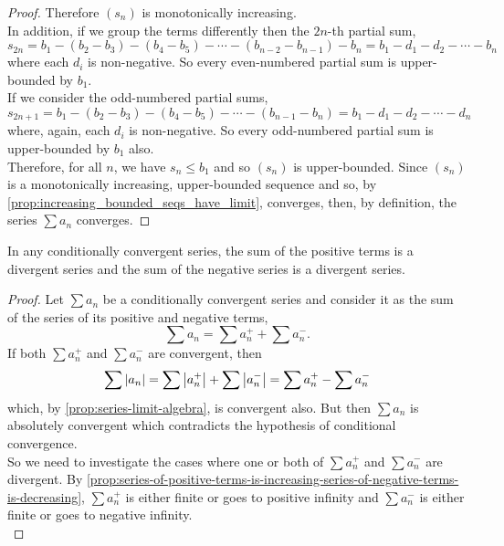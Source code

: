 \documentclass[../MathsNotesBase.tex]{subfiles}
\begin{document}
{\begin{proof}
			Therefore $(s_n)$ is monotonically increasing.\\
			
			In addition, if we group the terms differently then the $2n$-th partial sum,
			\[ s_{2n} = b_1 - (b_2 - b_3) - (b_4 - b_5) - \cdots - (b_{n-2} - b_{n-1}) - b_n = b_1 - d_1 - d_2 - \cdots - b_n \]
			where each $d_i$ is non-negative. So every even-numbered partial sum is upper-bounded by $b_1$.\\
			
			If we consider the odd-numbered partial sums,
			\[ s_{2n+1} = b_1 - (b_2 - b_3) - (b_4 - b_5) - \cdots - (b_{n-1} - b_n) = b_1 - d_1 - d_2 - \cdots - d_n \]
			where, again, each $d_i$ is non-negative. So every odd-numbered partial sum is upper-bounded by $b_1$ also.\\
			
			Therefore, for all $n$, we have ${ s_n \leq b_1 }$ and so $(s_n)$ is upper-bounded. Since $(s_n)$ is a monotonically increasing, upper-bounded sequence and so, by \autoref{prop:increasing_bounded_seqs_have_limit}, converges, then, by definition, the series ${ \sum a_n }$ converges.
		\end{proof}
	
		
		
		\nl[12]
		\begin{lemma}\label{lem:conditionally-convergent-series-comprises-infinte-positive-and-negative-series}
			In any conditionally convergent series, the sum of the positive terms is a divergent series and the sum of the negative series is a divergent series.
		\end{lemma}
		\begin{proof}
			Let ${ \sum a_n }$ be a conditionally convergent series and consider it as the sum of the series of its positive and negative terms,
			\[ \sum a_n = \sum a_n^+ + \sum a_n^-. \]
			If both ${ \sum a_n^+ }$ and ${ \sum a_n^- }$ are convergent, then 
			\[ \sum \left\lvert a_n\right\rvert = \sum \left\lvert a_n^+\right\rvert + \sum \left\lvert a_n^-\right\rvert = \sum a_n^+ - \sum a_n^- \]
			which, by \autoref{prop:series-limit-algebra}, is convergent also. But then ${ \sum a_n }$ is absolutely convergent which contradicts the hypothesis of conditional convergence.\\
			
			So we need to investigate the cases where one or both of ${ \sum a_n^+ }$ and ${ \sum a_n^- }$ are divergent. By \autoref{prop:series-of-positive-terms-is-increasing-series-of-negative-terms-is-decreasing}, ${ \sum a_n^+ }$ is either finite or goes to positive infinity and ${ \sum a_n^- }$ is either finite or goes to negative infinity.\\
			

\end{proof}}
\end{document}
